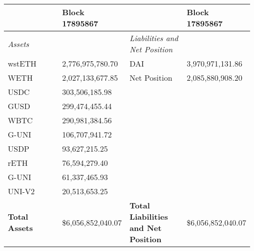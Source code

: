 
\begin{longtable}{@{}p{0.25\linewidth}p{0.25\linewidth}p{0.25\linewidth}p{0.25\linewidth}@{}}

\toprule


& Block 17895867 & & Block 17895867 \\

\midrule
\textit{Assets} & & \textit{Liabilities and Net Position} \\
wstETH & 2,776,975,780.70 & DAI &3,970,971,131.86 \\
WETH & 2,027,133,677.85 & Net Position &2,085,880,908.20 \\
USDC & 303,506,185.98 & & \\
GUSD & 299,474,455.44 & & \\
WBTC & 290,981,384.56 & & \\
G-UNI & 106,707,941.72 & & \\
USDP & 93,627,215.25 & & \\
rETH & 76,594,279.40 & & \\
G-UNI & 61,337,465.93 & & \\
UNI-V2 & 20,513,653.25 & & \\

\midrule

\textbf{Total Assets} & \$6,056,852,040.07 & \textbf{Total Liabilities and Net Position} & \$6,056,852,040.07 \\

\bottomrule

\end{longtable}
